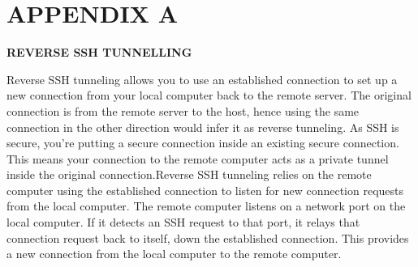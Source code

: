 \documentclass[12pt, a4paper]{report}
\begin{document}


 
 
\setcounter{chapter}{0}
\chapter*{APPENDIX A}
 \item \textbf{REVERSE SSH TUNNELLING}
  

\item \justify Reverse SSH tunneling allows you to use an established connection to set up a new connection from your local computer back to the remote server. The original connection is from the remote server to the host, hence using the same connection in the other direction would infer it as reverse tunneling. As SSH is secure, you’re putting a secure connection inside an existing secure connection. This means your connection to the remote computer acts as a private tunnel inside the original connection.Reverse SSH tunneling relies on the remote computer using the established connection to listen for new connection requests from the local computer. The remote computer listens on a network port on the local computer. If it detects an SSH request to that port, it relays that connection request back to itself, down the established connection. This provides a new connection from the local computer to the remote computer.\\\\
\end{document}
